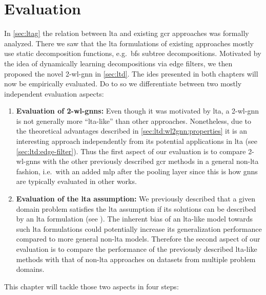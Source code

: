 \chapter{Evaluation}%
\label{sec:eval}

In \cref{sec:ltag} the relation between \ac{lta} and existing \ac{gcr} approaches was formally analyzed.
There we saw that the \ac{lta} formulations of existing approaches mostly use static decomposition functions, e.g.\ \ac{bfs} subtree decompositions.
Motivated by the idea of dynamically learning decompositions via edge filters, we then proposed the novel 2-\acs{wl}-\acs{gnn} in \cref{sec:ltd}.
The ides presented in both chapters will now be empirically evaluated.
Do to so we differentiate between two mostly independent evaluation aspects:
\begin{enumerate}[label={\textbf{\arabic*.}}]
	\item \textbf{Evaluation of 2-\acs{wl}-\acsp{gnn}:}
		Even though it was motivated by \ac{lta}, a 2-\acs{wl}-\acs{gnn} is not generally more ``\acs{lta}-like'' than other approaches.
		Nonetheless, due to the theoretical advantages described in \cref{sec:ltd:wl2gnn:properties} it is an interesting approach independently from its potential applications in \ac{lta} (see \cref{sec:ltd:edge-filter}).
		Thus the first aspect of our evaluation is to compare 2-\acs{wl}-\acsp{gnn} with the other previously described \ac{gcr} methods in a general non-\acs{lta} fashion, i.e.\ with an added \ac{mlp} after the pooling layer since this is how \acp{gnn} are typically evaluated in other works.
	\item \textbf{Evaluation of the \ac{lta} assumption:}
		We previously described that a given domain problem satisfies the \ac{lta} assumption if its solutions can be described by an \ac{lta} formulation (see ).
		The inherent bias of an \acs{lta}-like model towards such \ac{lta} formulations could potentially increase its generalization performance compared to more general non-\acs{lta} models.
		Therefore the second aspect of our evaluation is to compare the performance of the previously described \acs{lta}-like methods with that of non-\acs{lta} approaches on datasets from multiple problem domains.
\end{enumerate}
This chapter will tackle those two aspects in four steps:
